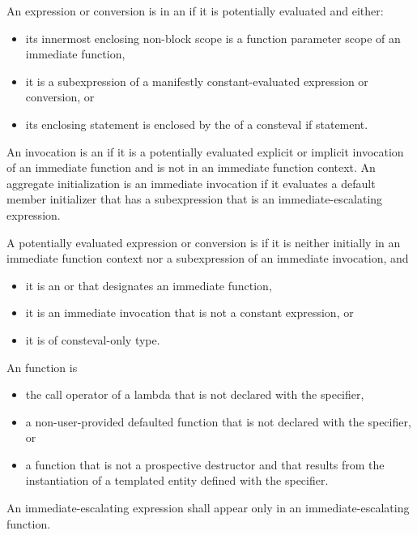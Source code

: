 \pnum
An expression or conversion is in an 
if it is potentially evaluated and either:
\begin{itemize}
\item
its innermost enclosing non-block scope is
a function parameter scope of an immediate function,
\item
it is a subexpression of a manifestly constant-evaluated expression
or conversion, or
\item
its enclosing statement is enclosed by
the  of a consteval if statement.
\end{itemize}
An invocation is an 
if it is a potentially evaluated explicit or implicit invocation of
an immediate function and
is not in an immediate function context.
An aggregate initialization is an immediate invocation
if it evaluates a default member initializer
that has a subexpression that is an immediate-escalating expression.

\pnum
{}%
%
%
%
A potentially evaluated expression or conversion is 
if it is neither initially in an immediate function context
nor a subexpression of an immediate invocation, and
\begin{itemize}
\item
it is an  or 
that designates an immediate function,
\item
it is an immediate invocation that is not a constant expression, or
\item
it is of consteval-only type.
\end{itemize}

\pnum
{}%
An  function is
\begin{itemize}
\item
the call operator of a lambda that is not declared
with the  specifier,
\item
a non-user-provided defaulted function
that is not declared with the  specifier, or
\item
a function that is not a prospective destructor and
that results from the instantiation
of a templated entity defined with the  specifier.
\end{itemize}
An immediate-escalating expression shall appear only
in an immediate-escalating function.

